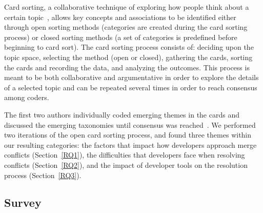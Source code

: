 Card sorting, a collaborative technique of exploring how people think about a certain topic~\cite{spencer2009card}\cite{card_sort},  allows key concepts and associations to be identified either through open sorting methods (categories are created during the card sorting process) or closed sorting methods (a set of categories is predefined before beginning to card sort).
The card sorting process consists of: deciding upon the topic space, selecting the method (open or closed), gathering the cards, sorting the cards and recording the data, and analyzing the outcomes.
This process is meant to be both collaborative and argumentative in order to explore the details of a selected topic and can be repeated several times in order to reach consensus among coders.

The first two authors individually coded emerging themes in the cards and discussed the emerging taxonomies until consensus was reached~\cite{card_sort}.
We performed two iterations of the open card sorting process, and found three themes within our resulting categories: the factors that impact how developers approach merge conflicts (Section~\ref{RQ1}), the difficulties that developers face when resolving conflicts (Section~\ref{RQ2}), and the impact of developer tools on the resolution process (Section~\ref{RQ3}).


\subsection{Survey}\label{survey_methods}

